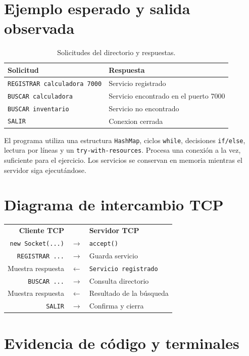 \documentclass[12pt,oneside]{book}
\begin{document}
\section{Ejemplo esperado y salida observada}
\begin{table}[H]\centering\small
\caption{Solicitudes del directorio y respuestas.}
\begin{tabularx}{\textwidth}{L L}
\toprule
\textbf{Solicitud} & \textbf{Respuesta}\\\midrule
\texttt{REGISTRAR calculadora 7000} & Servicio registrado\\
\texttt{BUSCAR calculadora} & Servicio encontrado en el puerto 7000\\
\texttt{BUSCAR inventario} & Servicio no encontrado\\
\texttt{SALIR} & Conexion cerrada\\
\bottomrule
\end{tabularx}
\end{table}

El programa utiliza una estructura \texttt{HashMap}, ciclos \texttt{while}, decisiones \texttt{if/else}, lectura por líneas y un \texttt{try-with-resources}. Procesa una conexión a la vez, suficiente para el ejercicio. Los servicios se conservan en memoria mientras el servidor siga ejecutándose.

\section{Diagrama de intercambio TCP}
\begin{center}
\begin{tabular}{r c l}
\textbf{Cliente TCP} & & \textbf{Servidor TCP}\\[.4em]
\texttt{new Socket(...)} & $\longrightarrow$ & \texttt{accept()}\\[.4em]
\texttt{REGISTRAR ...} & $\longrightarrow$ & Guarda servicio\\[.4em]
Muestra respuesta & $\longleftarrow$ & \texttt{Servicio registrado}\\[.4em]
\texttt{BUSCAR ...} & $\longrightarrow$ & Consulta directorio\\[.4em]
Muestra respuesta & $\longleftarrow$ & Resultado de la búsqueda\\[.4em]
\texttt{SALIR} & $\longrightarrow$ & Confirma y cierra
\end{tabular}
\end{center}

\section{Evidencia de código y terminales}
\end{document}
